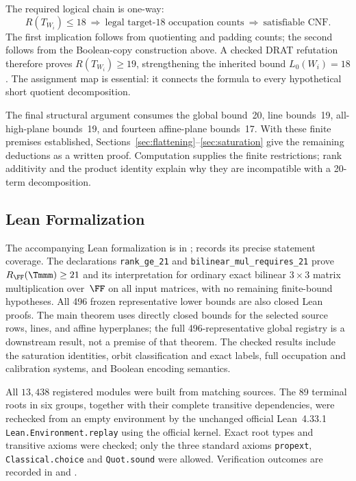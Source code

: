 \documentclass[11pt,a4paper]{article}
\begin{document}
The required logical chain is one-way:
\begin{equation}\label{eq:finite-proof-implication}
 R(T_{W_i})\le18
 \ \Longrightarrow\ \text{legal target-18 occupation counts}
 \ \Longrightarrow\ \text{satisfiable CNF}.
\end{equation}
The first implication follows from quotienting and padding counts; the
second follows from the Boolean-copy construction above. A checked DRAT
refutation therefore proves $R(T_{W_i})\ge19$, strengthening the inherited
bound $L_0(W_i)=18$. The assignment map is essential: it connects the
formula to every hypothetical short quotient decomposition.

The final structural argument consumes the global bound~20, line
bounds~19, all-high-plane bounds~19, and fourteen affine-plane bounds~17.
With these finite premises established,
Sections~\ref{sec:flattening}--\ref{sec:saturation} give the remaining
deductions as a written proof. Computation supplies the finite
restrictions; rank additivity and the product identity explain why they
are incompatible with a 20-term decomposition.

\subsection{Lean Formalization}\label{sec:lean}

The accompanying Lean formalization is in ;
 records its precise statement coverage.
The declarations \texttt{rank\_ge\_21} and
\texttt{bilinear\_mul\_requires\_21} prove $R_{\FF}(\Tmmm)\ge21$
and its interpretation for ordinary exact bilinear $3\times3$ matrix
multiplication over~$\FF$ on all input matrices, with no remaining
finite-bound hypotheses. All 496 frozen representative lower bounds are
also closed Lean proofs. The main theorem uses directly closed bounds
for the selected source rows, lines, and affine hyperplanes; the full
496-representative global registry is a downstream result, not a premise
of that theorem. The checked results include the saturation
identities, orbit classification and exact labels, full occupation and
calibration systems, and Boolean encoding semantics.

All $13{,}438$ registered modules were built from matching sources. The 89
terminal roots in six groups, together with their complete transitive
dependencies, were rechecked from an empty environment by the unchanged
official Lean~4.33.1 \texttt{Lean.Environment.replay} using the official
kernel. Exact root types and transitive axioms were checked; only the
three standard axioms \texttt{propext}, \texttt{Classical.choice} and
\texttt{Quot.sound} were allowed. Verification outcomes are recorded in
 and
.
\end{document}
